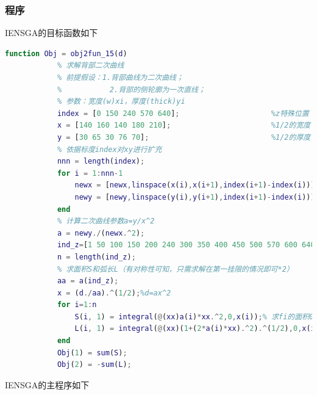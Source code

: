         \subsubsection{程序}
            \par
            IENSGA的目标函数如下
            \begin{lstlisting}[language = Matlab]
            function Obj = obj2fun_15(d)
            % 求解背部二次曲线
            % 前提假设：1.背部曲线为二次曲线；
            %           2.背部的侧轮廓为一次直线；
            % 参数：宽度(w)xi，厚度(thick)yi
            index = [0 150 240 570 640];                     %z特殊位置
            x = [140 160 140 180 210];                       %1/2的宽度
            y = [30 65 30 76 70];                            %1/2的厚度
            % 依据标度index对xy进行扩充
            nnn = length(index);
            for i = 1:nnn-1
                newx = [newx,linspace(x(i),x(i+1),index(i+1)-index(i))];
                newy = [newy,linspace(y(i),y(i+1),index(i+1)-index(i))];
            end
            % 计算二次曲线参数a=y/x^2
            a = newy./(newx.^2);
            ind_z=[1 50 100 150 200 240 300 350 400 450 500 570 600 640];
            n = length(ind_z);
            % 求面积S和弧长L（有对称性可知，只需求解在第一挂限的情况即可*2）
            aa = a(ind_z);
            x = (d./aa).^(1/2);%d=ax^2
            for i=1:n
                S(i, 1) = integral(@(xx)a(i)*xx.^2,0,x(i));% 求fi的面积0-xi(积分)
                L(i, 1) = integral(@(xx)(1+(2*a(i)*xx).^2).^(1/2),0,x(i));%求fi的弧长
            end
            Obj(1) = sum(S);
            Obj(2) = -sum(L);
            \end{lstlisting}
            IENSGA的主程序如下
